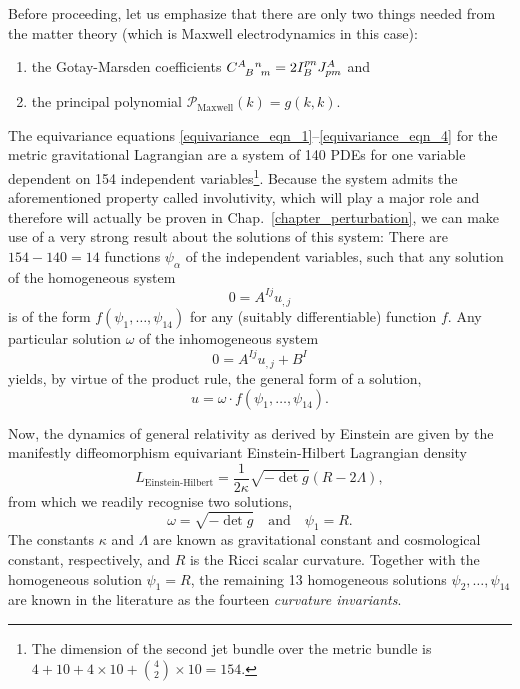 Before proceeding, let us emphasize that there are only two things needed from the matter theory (which is Maxwell electrodynamics in this case):
\begin{enumerate}
  \item the Gotay-Marsden coefficients $\gmc{A}{B}{n}{m} = 2 I_B^{pn} J^A_{pm}$ and
  \item the principal polynomial $\mathcal P_\text{Maxwell}(k) = g(k,k)$.
\end{enumerate}

The equivariance equations \eqref{equivariance_eqn_1}--\eqref{equivariance_eqn_4} for the metric gravitational Lagrangian are a system of 140 PDEs for one variable dependent on 154 independent variables\footnote{The dimension of the second jet bundle over the metric bundle is $4+10+4\times 10 + \binom{4}{2}\times 10=154$.}. Because the system admits the aforementioned property called involutivity, which will play a major role and therefore will actually be proven in Chap.~\ref{chapter_perturbation}, we can make use of a very strong result about the solutions of this system\cite{seiler}: There are $154-140=14$ functions $\psi_\alpha$ of the independent variables, such that any solution of the homogeneous system
\begin{equation}
  0 = A^{Ij} u_{,j}
\end{equation}
is of the form $f(\psi_1,\dots,\psi_{14})$ for any (suitably differentiable) function $f$. Any particular solution $\omega$ of the inhomogeneous system
\begin{equation}
  0 = A^{Ij} u_{,j} + B^I
\end{equation}
yields, by virtue of the product rule, the general form of a solution,
\begin{equation}\label{general_metric_solution}
  u = \omega\cdot f(\psi_1,\dots,\psi_{14}).
\end{equation}

Now, the dynamics of general relativity as derived by Einstein are given by the manifestly diffeomorphism equivariant Einstein-Hilbert Lagrangian density
\begin{equation}\label{einstein_hilbert}
  L_\text{Einstein-Hilbert} = \frac{1}{2\kappa} \sqrt{-\operatorname{det}g}(R - 2\Lambda),
\end{equation}
from which we readily recognise two solutions,
\begin{equation}
  \omega = \sqrt{-\operatorname{det}g}\quad\text{and}\quad \psi_1 = R.
\end{equation}
The constants $\kappa$ and $\Lambda$ are known as gravitational constant and cosmological constant, respectively, and $R$ is the Ricci scalar curvature. Together with the homogeneous solution $\psi_1=R$, the remaining 13 homogeneous solutions $\psi_2,\dots,\psi_{14}$ are known in the literature as the fourteen \emph{curvature invariants}\cite{curvature_invariants}.

